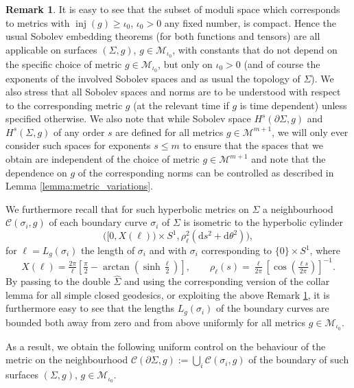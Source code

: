 \documentclass[10pt,reqno]{amsart}
\theoremstyle{plain}
\theoremstyle{definition}
\newtheorem{rmk}[lemma]{Remark}
\numberwithin{equation}{section}
\newcommand{\si}{\sigma}
\newcommand{\Si}{\Sigma}
\DeclareMathOperator{\inj}{inj}
\newcommand{\beq}{\begin{equation}}
\newcommand{\eeq}{\end{equation}}
\newcommand{\dd}{\mathrm{d}} %
\newcommand{\Col}{\mathcal C}
\newcommand{\pSi}{{\partial \Sigma}}
\newcommand{\MM}{\mathcal{M}} %
\newcommand{\MMiota}{\MM_{\iota_0}}
\begin{document}
 
\begin{rmk}\label{rmk:compact-moduli}
    It is easy to see that the subset of moduli space which corresponds to metrics with $\inj(g)\geq \iota_0$, $\iota_0>0$ any fixed number, is compact. Hence the usual Sobolev embedding theorems (for both functions and tensors) are all applicable on surfaces $(\Si,g)$, $g\in \MMiota$, with constants that do not depend on the specific choice of metric $g\in \MMiota$, but only on $\iota_0>0$ (and of course the exponents of the involved Sobolev spaces and as usual the topology of $\Si$). We also stress that all Sobolev spaces and norms are to be understood with respect to the corresponding metric $g$ (at the relevant time if $g$ is time dependent) unless specified otherwise. We also note that while Sobolev space $H^s(\pSi,g)$ and $H^s(\Si,g)$ of any order $s$ are defined for all metrics $g\in \MM^{m+1}$, we will only ever consider such spaces for exponents $s\leq m$ to ensure that the spaces that we obtain are independent of the choice of metric $g\in \MM^{m+1}$ and note that the dependence on $g$ of the corresponding norms can be controlled as described in Lemma \ref{lemma:metric_variations}.
\end{rmk}
We furthermore recall that for such hyperbolic metrics on $\Si$ a neighbourhood $\Col(\si_i,g)$ of each boundary curve $\si_i$ of $\Si$ is isometric to the hyperbolic cylinder
\beq\label{eq:collar}
    \big([0,X(\ell))\times S^1,\rho_{\ell}^2 (\dd s^2+\dd \theta^2)\big), 
\eeq
for $\ell=L_{g}(\si_i)$ the length of $\si_i$ and with $\si_i$ corresponding to $\{0\}\times S^1$, where
\beq \label{eq:collar-X-rho}
    X(\ell)=\tfrac{2\pi}{\ell}[\tfrac\pi2-\arctan(\sinh\tfrac{\ell}{2})], \qquad \rho_\ell(s)=\tfrac{\ell}{2\pi} [ \cos(\tfrac{\ell s}{2\pi})]^{-1}.
\eeq
By passing to the double $\hat\Si$ and using the corresponding version of the collar lemma for all simple closed geodesics, or exploiting the above Remark \ref{rmk:compact-moduli}, it is furthermore easy to see that the lengths $L_{g}(\si_i)$ of the boundary curves are bounded both away from zero and from above uniformly for all metrics $g\in\MMiota$. 

As a result, we obtain the following uniform control on the behaviour of the metric on the neighbourhood $\Col(\pSi,g) := \bigcup_i\Col(\si_i,g)$ of the boundary of such surfaces $(\Si,g)$, $g\in \MMiota$.
\end{document}

